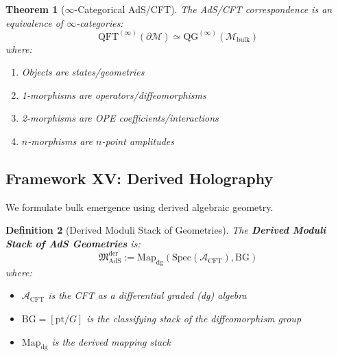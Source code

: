 \documentclass[12pt,a4paper]{article}
\newtheorem{theorem}{Theorem}[section]
\newtheorem{definition}[theorem]{Definition}
\begin{document}
\begin{theorem}[$\infty$-Categorical AdS/CFT]\label{thm:infty-adscft}
The AdS/CFT correspondence is an equivalence of $\infty$-categories:
\begin{equation}
\text{QFT}^{(\infty)}(\partial\mathcal{M}) \simeq \text{QG}^{(\infty)}(\mathcal{M}_{\text{bulk}})
\end{equation}
where:
\begin{enumerate}
    \item Objects are states/geometries
    \item 1-morphisms are operators/diffeomorphisms
    \item 2-morphisms are OPE coefficients/interactions
    \item $n$-morphisms are $n$-point amplitudes
\end{enumerate}
\end{theorem}

\subsection{Framework XV: Derived Holography}

We formulate bulk emergence using derived algebraic geometry.

\begin{definition}[Derived Moduli Stack of Geometries]\label{def:derived-moduli}
The \textbf{Derived Moduli Stack of AdS Geometries} is:
\begin{equation}
\mathfrak{M}_{\text{AdS}}^{\text{der}} := \text{Map}_{\text{dg}}(\text{Spec}(\mathcal{A}_{\text{CFT}}), \text{BG})
\end{equation}
where:
\begin{itemize}
    \item $\mathcal{A}_{\text{CFT}}$ is the CFT as a differential graded (dg) algebra
    \item $\text{BG} = [\text{pt}/G]$ is the classifying stack of the diffeomorphism group
    \item $\text{Map}_{\text{dg}}$ is the derived mapping stack
\end{itemize}
\end{definition}
\end{document}
